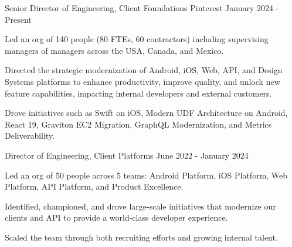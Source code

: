 

\begin{cventries}

  \cventry
    {Senior Director of Engineering, Client Foundations} %
    {Pinterest} %
    {} %
    {January 2024 - Present} %
    {
	\begin{cvitems} %
	\item Led an org of 140 people (80 FTEs, 60 contractors) including supervising managers of managers across the USA, Canada, and Mexico.
	\item Directed the strategic modernization of Android, iOS, Web, API, and Design Systems platforms to enhance productivity, improve quality, and unlock new feature capabilities, impacting internal developers and external customers.
	\item Drove initiatives such as Swift on iOS, Modern UDF Architecture on Android, React 19, Graviton EC2 Migration, GraphQL Modernization, and Metrics Deliverability.
	\end{cvitems}
    }
    
  \cventry
    {Director of Engineering, Client Platforms} %
    {} %
    {} %
    {June 2022 - January 2024} %
    {
	\begin{cvitems} %
	\item Led an org of 50 people across 5 teams: Android Platform, iOS Platform, Web Platform, API Platform, and Product Excellence.
	\item Identified, championed, and drove large-scale initiatives that modernize our clients and API to provide a world-class developer experience.
	\item Scaled the team through both recruiting efforts and growing internal talent.
	\end{cvitems}
    }


\end{cventries}
